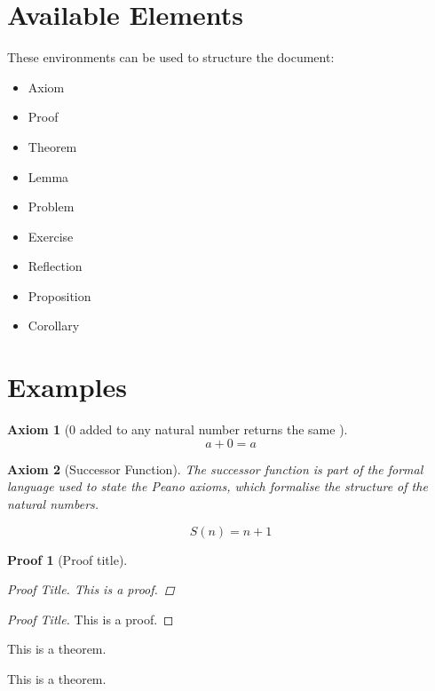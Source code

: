 \documentclass[12pt]{article}
\newtheorem{p}{Proof}
\newtheorem{axiom}{Axiom}
\begin{document}
\tableofcontents
\section{Available Elements}
These environments can be used to structure the document:
\begin{itemize}
	\item Axiom
	\item Proof
	\item Theorem
	\item Lemma
	\item Problem
	\item Exercise
	\item Reflection
	\item Proposition
	\item Corollary
\end{itemize}


\section{Examples}

\begin{axiom}[0 added to any natural number returns the same  ]
	\begin{equation}
		a+0=a
	\end{equation}		
\end{axiom}

\begin{axiom}[Successor Function]
The successor function is part of the formal language used to state the Peano axioms, which formalise the structure of the natural numbers.

\begin{equation}
S(n) = n+1
\end{equation}
\end{axiom}

\begin{p}[Proof title]
	\begin{proof}[Proof Title]
		This is a proof.
	\end{proof}
\end{p}

\begin{proof}[Proof Title]
	This is a proof.
\end{proof}

\begin{theorem}
	This is a theorem.
\end{theorem}

\begin{theorem}
	This is a theorem.
\end{theorem}
\end{document}
